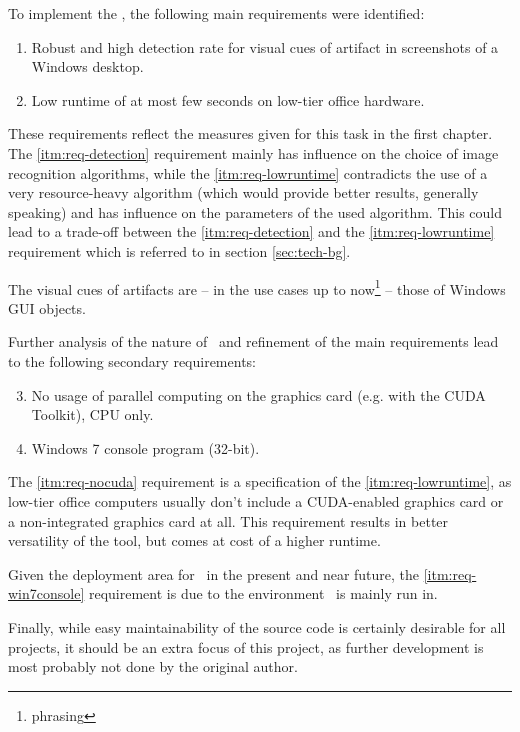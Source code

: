 To implement the \vd, the following main requirements were identified:

\begin{enumerate}
	\item \label{itm:req-detection} Robust and high detection rate for visual cues of artifact in screenshots of a Windows desktop.
	\item \label{itm:req-lowruntime} Low runtime of at most few seconds on low-tier office hardware.
\end{enumerate}

These requirements reflect the measures given for this task in the first chapter. The \ref{itm:req-detection} requirement mainly has influence on the choice of image recognition algorithms, while the \ref{itm:req-lowruntime} contradicts the use of a very resource-heavy algorithm (which would provide better results, generally speaking) and has influence on the parameters of the used algorithm. This could lead to a trade-off between the \ref{itm:req-detection} and the \ref{itm:req-lowruntime} requirement which is referred to in section \ref{sec:tech-bg}.

The visual cues of artifacts are -- in the use cases up to now\footnote{phrasing} -- those of Windows GUI objects.

Further analysis of the nature of \ape~and refinement of the main requirements lead to the following secondary requirements:

\begin{enumerate}\setcounter{enumi}{2}
	\item \label{itm:req-nocuda} No usage of parallel computing on the graphics card (e.g. with the CUDA Toolkit\cite{cuda}), CPU only.
	\item \label{itm:req-win7console} Windows 7 console program (32-bit).
\end{enumerate}

The \ref{itm:req-nocuda} requirement is a specification of the \ref{itm:req-lowruntime}, as low-tier office computers usually don't include a CUDA-enabled graphics card or a non-integrated graphics card at all. This requirement results in better versatility of the tool, but comes at cost of a higher runtime.

Given the deployment area for \ape~in the present and near future, the \ref{itm:req-win7console} requirement is due to the environment \ape~is mainly run in.

Finally, while easy maintainability of the source code is certainly desirable for all projects, it should be an extra focus of this project, as further development is most probably not done by the original author.

